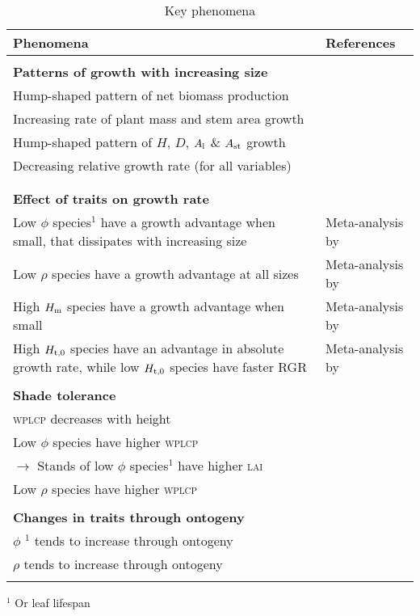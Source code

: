 \documentclass[a4paper,11pt]{article}
\begin{document}
\begin{table}[ht]
\caption{Key phenomena}
{\footnotesize
{\centering
  \begin{tabular}{p{9cm}p{6cm}}
  \hline
  Phenomena & References \\
  \hline

  \\\multicolumn{2}{l}{\bf{Patterns of growth with increasing size}}\\
  Hump-shaped pattern of net biomass production & \citet{Givnish-1988, Koch-2004} \\
  Increasing rate of plant mass and stem area growth & \citet{Stephenson-2014} \\
  Hump-shaped pattern of $H$, $D$, $A_{\rm l}$ \& $A_{\rm st}$ growth& \citet{King-2005, Sillett-2010, King-2011, Herault-2011Ryan-2006} \\
  Decreasing relative growth rate (for all variables) & \citet{Rees-2010, Iida-2014}\\
  \\
  \\ \multicolumn{2}{l}{\bf{Effect of traits on growth rate}}\\
  Low $\phi$ species$^1$  have a growth advantage when small, that dissipates with increasing size & Meta-analysis by \citet{Gibert-2016}\\
  Low $\rho$ species have a growth advantage at all sizes & Meta-analysis by \citet{Gibert-2016}\\
  High $H_{\rm m}$ species have a growth advantage when small & Meta-analysis by \citet{Gibert-2016}\\
  High $H_{\rm t,0}$ species have an advantage in absolute growth rate, while low $H_{\rm t,0}$ species have faster RGR & Meta-analysis by \citet{Gibert-2016}\\

  \\ \multicolumn{2}{l}{\bf{Shade tolerance}}\\
  \textsc{wplcp} decreases with height & \citet{Givnish-1988}\\
  Low $\phi$ species have higher \textsc{wplcp} & \citet{Poorter-2006, Lusk-2008}\\
  \quad $\rightarrow$ Stands of low $\phi$ species$^1$  have higher \textsc{lai} &  \citet{Reich-1992, Gower-1993, Niinemets-2010} \\
  Low $\rho$ species have higher \textsc{wplcp} &  \citet{Osunkoya-1996}\\

  \\ \multicolumn{2}{l}{\bf{Changes in traits through ontogeny}}\\
  $\phi$ $^1$ tends to increase through ontogeny & \\
  $\rho$ tends to increase through ontogeny & \citet{Osazuwa-2014}\\

  \hline
  \\
  \end{tabular}
  }
$^1$ Or leaf lifespan
}
\label{tab:phenomena}
\end{table}
\end{document}
